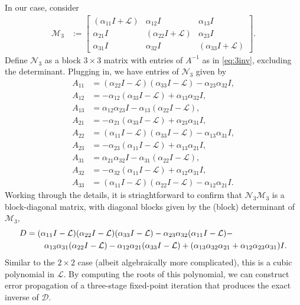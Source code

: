 \documentclass[a4paper,10pt]{article}
\begin{document}
In our case, consider 
%
\begin{align}\label{eq:Mnt}
\mathcal{M}_3 &:= \begin{bmatrix} (\alpha_{11} I + \mathcal{L}) & \alpha_{12}I & \alpha_{13}I \\
    \alpha_{21}I & (\alpha_{22}I + \mathcal{L}) & \alpha_{23} I \\
    \alpha_{31}I & \alpha_{32}I & (\alpha_{33} I + \mathcal{L}) \end{bmatrix}.
\end{align}
%
Define $\mathcal{N}_3$ as a block $3\times 3$ matrix with entries of $A^{-1}$ as in \eqref{eq:3inv},
excluding the determinant. Plugging in, we have entries of $\mathcal{N}_3$ given by
%
\begin{align*}
A_{11} &=  (\alpha_{22}I - \mathcal{L})(\alpha_{33} I - \mathcal{L}) - \alpha_{23}\alpha_{32}I, \\
    A_{12} &= -\alpha_{12}(\alpha_{33} I - \mathcal{L}) + \alpha_{13}\alpha_{32}I, \\
    A_{13} &=  \alpha_{12}\alpha_{23} I - \alpha_{13}(\alpha_{22}I - \mathcal{L}), \\
A_{21} &= -\alpha_{21}(\alpha_{33} I - \mathcal{L}) + \alpha_{23} \alpha_{31}I, \\
    A_{22} &=  (\alpha_{11} I - \mathcal{L})(\alpha_{33} I - \mathcal{L}) - \alpha_{13}\alpha_{31}I, \\
    A_{23} &= -\alpha_{23}(\alpha_{11} I - \mathcal{L}) + \alpha_{13}\alpha_{21}I, \\
A_{31} &=  \alpha_{21}\alpha_{32}I - \alpha_{31}(\alpha_{22}I - \mathcal{L}), \\
    A_{32} &= -\alpha_{32}(\alpha_{11} I - \mathcal{L}) + \alpha_{12}\alpha_{31}I, \\
    A_{33} &=  (\alpha_{11} I - \mathcal{L})(\alpha_{22}I - \mathcal{L}) - \alpha_{12}\alpha_{21}I.
\end{align*}
%
Working through the details, it is striaghtforward to confirm that $\mathcal{N}_3\mathcal{M}_3$
is a block-diagonal matrix, with diagonal blocks given by the (block) determinant of $\mathcal{M}_3$,
%
\begin{align*}
D & = (\alpha_{11}I - \mathcal{L}) (\alpha_{22}I - \mathcal{L})(\alpha_{33} I - \mathcal{L}) -
	\alpha_{23}\alpha_{32}(\alpha_{11}I - \mathcal{L}) - \\
& \hspace{5ex} 
	\alpha_{13}\alpha_{31}(\alpha_{22}I - \mathcal{L}) -
	\alpha_{12}\alpha_{21}(\alpha_{33}I - \mathcal{L}) + (\alpha_{13}\alpha_{32}\alpha_{21} + \alpha_{12}\alpha_{23}\alpha_{31})I.
\end{align*}
%
Similar to the $2\times 2$ case (albeit algebraically more complicated), this is a cubic polynomial in
$\mathcal{L}$. By computing the roots of this polynomial, we can construct error propagation of a
three-stage fixed-point iteration that produces the exact inverse of $\mathcal{D}$. 
\end{document}
